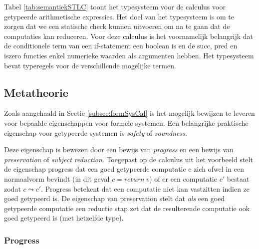 Tabel \ref{tab:semantiekSTLC} toont het typesysteem voor de calculus voor getypeerde arithmetische expressies. Het doel van het typesysteem is om te zorgen dat we een statische check kunnen uitvoeren om na te gaan dat de computaties kan reduceren. Voor deze calculus is het voornamelijk belangrijk dat de conditionele term van een if-statement een boolean is en de succ, pred en iszero functies enkel numerieke waarden als argumenten hebben. Het typesysteem bevat typeregels voor de verschillende mogelijke termen.

\subsection{Metatheorie}
Zoals aangehaald in Sectie \ref{subsec:formSysCal} is het mogelijk bewijzen te leveren voor bepaalde eigenschappen voor formele systemen. Een belangrijke praktische eigenschap voor getypeerde systemen is \emph{safety} of \emph{soundness}.\newline 

Deze eigenschap is bewezen door een bewijs van \emph{progress} en een bewijs van \emph{preservation} of \emph{subject reduction}. Toegepast op de calculus uit het voorbeeld stelt de eigenschap progress dat een goed getypeerde computatie c zich ofwel in een normaalvorm bevindt (in dit geval $c = return \  v$) of er een computatie $c'$ bestaat zodat $c \leadsto c'$. Progress betekent dat een computatie niet kan vastzitten indien ze goed getypeerd is. De eigenschap van preservation stelt dat \emph{als} een goed getypeerde computatie een reductie stap zet dat de resulterende computatie ook goed getypeerd is (met hetzelfde type). \newline 

\subsubsection{Progress}

